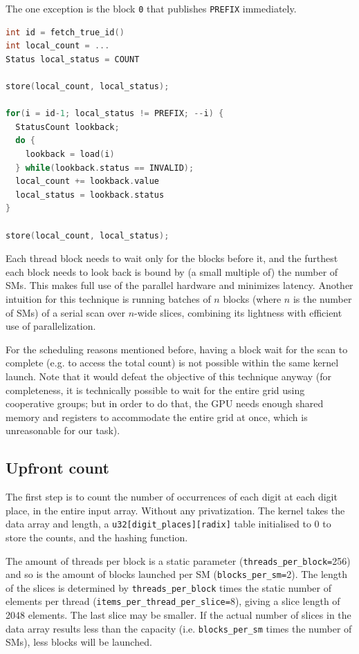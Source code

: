 \documentclass[a4paper]{report}
\begin{document}
The one exception is the block \lstinline{0} that publishes \lstinline{PREFIX} immediately.

\begin{lstlisting}[caption={Pseudocode for Chained scan with decoupled look-back}, language=c]
int id = fetch_true_id()
int local_count = ...
Status local_status = COUNT

store(local_count, local_status);
  
for(i = id-1; local_status != PREFIX; --i) {
  StatusCount lookback;
  do {
    lookback = load(i)
  } while(lookback.status == INVALID);
  local_count += lookback.value
  local_status = lookback.status
}

store(local_count, local_status);
\end{lstlisting}

Each thread block needs to wait only for the blocks before it, and the furthest each block needs to look back is bound by (a small multiple of) the number of SMs. This makes full use of the parallel hardware and minimizes latency. Another intuition for this technique is running batches of $n$ blocks (where $n$ is the number of SMs) of a serial scan over $n$-wide slices, combining its lightness with efficient use of parallelization.

For the scheduling reasons mentioned before, having a block wait for the scan to complete (e.g. to access the total count) is not possible within the same kernel launch. Note that it would defeat the objective of this technique anyway (for completeness, it is technically possible to wait for the entire grid using cooperative groups; but in order to do that, the GPU needs enough shared memory and registers to accommodate the entire grid at once, which is unreasonable for our task).

\subsection{Upfront count}

The first step is to count the number of occurrences of each digit at each digit place, in the entire input array. Without any privatization. The kernel takes the data array and length, a \lstinline{u32[digit_places][radix]} table initialised to 0 to store the counts, and the hashing function.

The amount of threads per block is a static parameter (\lstinline{threads_per_block=}256) and so is the amount of blocks launched per SM (\lstinline{blocks_per_sm=}2). The length of the slices is determined by \lstinline{threads_per_block} times the static number of elements per thread (\lstinline{items_per_thread_per_slice=}8), giving a slice length of 2048 elements. The last slice may be smaller. If the actual number of slices in the data array results less than the capacity (i.e. \lstinline{blocks_per_sm} times the number of SMs), less blocks will be launched. 
\end{document}
